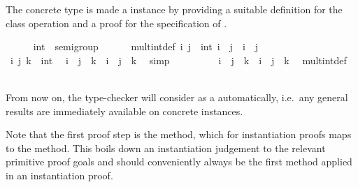 \begin{isabellebody}
\isamarkuptrue%
%
\isamarkuptrue%
%
\begin{isamarkuptext}%
The concrete type  is made a 
  instance by providing a suitable definition for the class operation
   and a proof for the specification of .%
\end{isamarkuptext}%
\isamarkuptrue%
\ \ \ \ \isamarkupfalse%
\ int\ {\isacharcolon}{\isacharcolon}\ semigroup\isanewline
\ \ \ \ \ \ mult{\isacharunderscore}int{\isacharunderscore}def{\isacharcolon}\ {\isachardoublequoteopen}{\isasymAnd}i\ j\ {\isacharcolon}{\isacharcolon}\ int{\isachardot}\ i\ {\isasymotimes}\ j\ {\isasymequiv}\ i\ {\isacharplus}\ j{\isachardoublequoteclose}\isanewline
%
\isadelimproof
\ \ \ \ %
\endisadelimproof
%
\isatagproof
{}\isamarkupfalse%
\isanewline
\ \ \ \ \ \ \isamarkupfalse%
\ i\ j\ k\ {\isacharcolon}{\isacharcolon}\ int\ \isamarkupfalse%
\ {\isachardoublequoteopen}{\isacharparenleft}i\ {\isacharplus}\ j{\isacharparenright}\ {\isacharplus}\ k\ {\isacharequal}\ i\ {\isacharplus}\ {\isacharparenleft}j\ {\isacharplus}\ k{\isacharparenright}{\isachardoublequoteclose}\ \isamarkupfalse%
\ simp\isanewline
\ \ \ \ \ \ \isamarkupfalse%
\ \isamarkupfalse%
\ {\isachardoublequoteopen}{\isacharparenleft}i\ {\isasymotimes}\ j{\isacharparenright}\ {\isasymotimes}\ k\ {\isacharequal}\ i\ {\isasymotimes}\ {\isacharparenleft}j\ {\isasymotimes}\ k{\isacharparenright}{\isachardoublequoteclose}\ \isamarkupfalse%
\ mult{\isacharunderscore}int{\isacharunderscore}def\ \isacommand{{\isachardot}}\isamarkupfalse%
\isanewline
\ \ \ \ \isamarkupfalse%
%
\endisatagproof
{\isafoldproof}%
%
\isadelimproof
%
\endisadelimproof
%
\begin{isamarkuptext}%
\noindent From now on, the type-checker will consider 
  as a  automatically, i.e.\ any general results
  are immediately available on concrete instances.

  Note that the first proof step is the  method,
  which for instantiation proofs maps to the  method.
  This boils down an instantiation judgement to the relevant primitive
  proof goals and should conveniently always be the first method applied
  in an instantiation proof.


\end{isamarkuptext}
\end{isabellebody}
